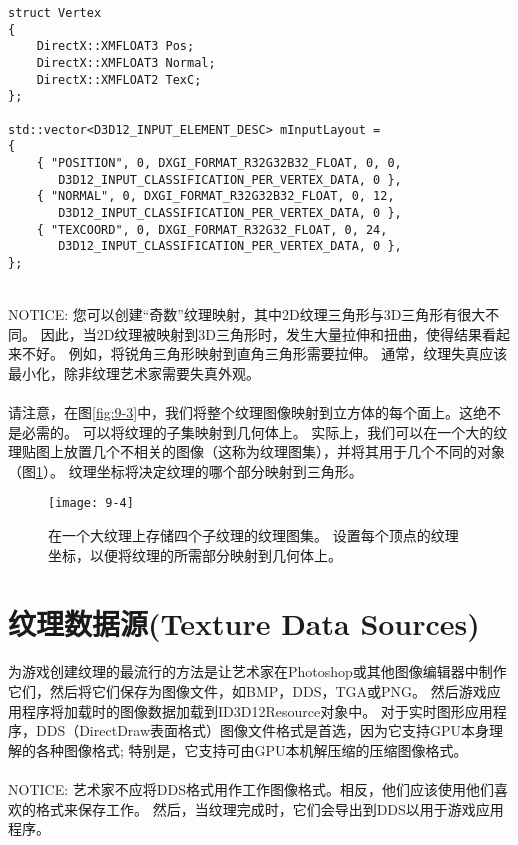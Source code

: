 \begin{lstlisting}
struct Vertex
{
    DirectX::XMFLOAT3 Pos;
    DirectX::XMFLOAT3 Normal;
    DirectX::XMFLOAT2 TexC;
};

std::vector<D3D12_INPUT_ELEMENT_DESC> mInputLayout =
{
    { "POSITION", 0, DXGI_FORMAT_R32G32B32_FLOAT, 0, 0,
       D3D12_INPUT_CLASSIFICATION_PER_VERTEX_DATA, 0 },
    { "NORMAL", 0, DXGI_FORMAT_R32G32B32_FLOAT, 0, 12,
       D3D12_INPUT_CLASSIFICATION_PER_VERTEX_DATA, 0 },
    { "TEXCOORD", 0, DXGI_FORMAT_R32G32_FLOAT, 0, 24,
       D3D12_INPUT_CLASSIFICATION_PER_VERTEX_DATA, 0 },
};
\end{lstlisting}

\begin{flushleft}
~\\
NOTICE: 您可以创建“奇数”纹理映射，其中2D纹理三角形与3D三角形有很大不同。 因此，当2D纹理被映射到3D三角形时，发生大量拉伸和扭曲，使得结果看起来不好。 例如，将锐角三角形映射到直角三角形需要拉伸。 通常，纹理失真应该最小化，除非纹理艺术家需要失真外观。\\
~\\
请注意，在图\ref{fig:9-3}中，我们将整个纹理图像映射到立方体的每个面上。这绝不是必需的。 可以将纹理的子集映射到几何体上。 实际上，我们可以在一个大的纹理贴图上放置几个不相关的图像（这称为纹理图集），并将其用于几个不同的对象（图\ref{fig:9-4}）。 纹理坐标将决定纹理的哪个部分映射到三角形。\\
\end{flushleft}

\begin{figure}[h]
    \texttt{[image: 9-4]}
    \centering
    \caption{在一个大纹理上存储四个子纹理的纹理图集。 设置每个顶点的纹理坐标，以便将纹理的所需部分映射到几何体上。}
    \label{fig:9-4}
\end{figure}

\section{纹理数据源(Texture Data Sources)}
\begin{flushleft}
为游戏创建纹理的最流行的方法是让艺术家在Photoshop或其他图像编辑器中制作它们，然后将它们保存为图像文件，如BMP，DDS，TGA或PNG。 然后游戏应用程序将加载时的图像数据加载到ID3D12Resource对象中。 对于实时图形应用程序，DDS（DirectDraw表面格式）图像文件格式是首选，因为它支持GPU本身理解的各种图像格式; 特别是，它支持可由GPU本机解压缩的压缩图像格式。\\
~\\
NOTICE: 艺术家不应将DDS格式用作工作图像格式。相反，他们应该使用他们喜欢的格式来保存工作。 然后，当纹理完成时，它们会导出到DDS以用于游戏应用程序。
~\\
\end{flushleft}

